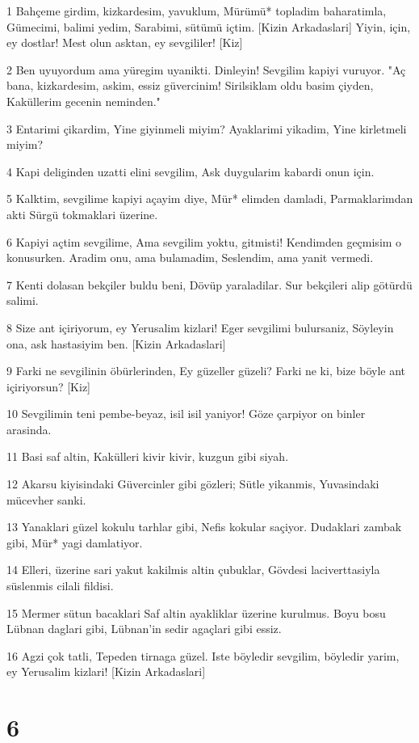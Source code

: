 \par 1 Bahçeme girdim, kizkardesim, yavuklum, Mürümü* topladim baharatimla, Gümecimi, balimi yedim, Sarabimi, sütümü içtim. [Kizin Arkadaslari] Yiyin, için, ey dostlar! Mest olun asktan, ey sevgililer! [Kiz]
\par 2 Ben uyuyordum ama yüregim uyanikti. Dinleyin! Sevgilim kapiyi vuruyor. "Aç bana, kizkardesim, askim, essiz güvercinim! Sirilsiklam oldu basim çiyden, Kaküllerim gecenin neminden."
\par 3 Entarimi çikardim, Yine giyinmeli miyim? Ayaklarimi yikadim, Yine kirletmeli miyim?
\par 4 Kapi deliginden uzatti elini sevgilim, Ask duygularim kabardi onun için.
\par 5 Kalktim, sevgilime kapiyi açayim diye, Mür* elimden damladi, Parmaklarimdan akti Sürgü tokmaklari üzerine.
\par 6 Kapiyi açtim sevgilime, Ama sevgilim yoktu, gitmisti! Kendimden geçmisim o konusurken. Aradim onu, ama bulamadim, Seslendim, ama yanit vermedi.
\par 7 Kenti dolasan bekçiler buldu beni, Dövüp yaraladilar. Sur bekçileri alip götürdü salimi.
\par 8 Size ant içiriyorum, ey Yerusalim kizlari! Eger sevgilimi bulursaniz, Söyleyin ona, ask hastasiyim ben. [Kizin Arkadaslari]
\par 9 Farki ne sevgilinin öbürlerinden, Ey güzeller güzeli? Farki ne ki, bize böyle ant içiriyorsun? [Kiz]
\par 10 Sevgilimin teni pembe-beyaz, isil isil yaniyor! Göze çarpiyor on binler arasinda.
\par 11 Basi saf altin, Kakülleri kivir kivir, kuzgun gibi siyah.
\par 12 Akarsu kiyisindaki Güvercinler gibi gözleri; Sütle yikanmis, Yuvasindaki mücevher sanki.
\par 13 Yanaklari güzel kokulu tarhlar gibi, Nefis kokular saçiyor. Dudaklari zambak gibi, Mür* yagi damlatiyor.
\par 14 Elleri, üzerine sari yakut kakilmis altin çubuklar, Gövdesi laciverttasiyla süslenmis cilali fildisi.
\par 15 Mermer sütun bacaklari Saf altin ayakliklar üzerine kurulmus. Boyu bosu Lübnan daglari gibi, Lübnan'in sedir agaçlari gibi essiz.
\par 16 Agzi çok tatli, Tepeden tirnaga güzel. Iste böyledir sevgilim, böyledir yarim, ey Yerusalim kizlari! [Kizin Arkadaslari]

\chapter{6}


